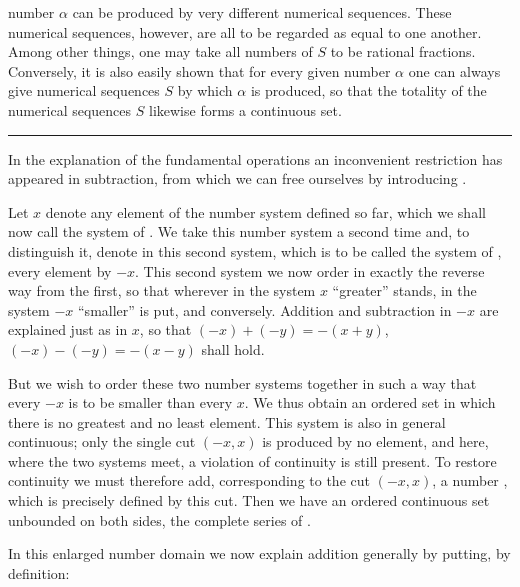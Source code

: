 number $\alpha$ can be produced by very different numerical sequences.
These numerical sequences, however, are all to be regarded as equal to
one another. Among other things, one may take all numbers of $S$ to be
rational fractions. Conversely, it is also easily shown that for every
given number $\alpha$ one can always give numerical sequences $S$ by
which $\alpha$ is produced, so that the totality of the numerical
sequences $S$ likewise forms a continuous set.

\begin{center}
\rule{0.18\linewidth}{0.4pt}
\end{center}

In the explanation of the fundamental operations an inconvenient
restriction has appeared in subtraction, from which we can free
ourselves by introducing .

Let $x$ denote any element of the number system defined so far, which
we shall now call the system of . We take
this number system a second time and, to distinguish it, denote in this
second system, which is to be called the system of , every element by $-x$. This second system we now order in
exactly the reverse way from the first, so that wherever in the system
$x$ ``greater'' stands, in the system $-x$ ``smaller'' is put, and
conversely. Addition and subtraction in $-x$ are explained just as in
$x$, so that $(-x)+(-y)=-(x+y)$, $(-x)-(-y)=-(x-y)$ shall hold.

But we wish to order these two number systems together in such a way
that every $-x$ is to be smaller than every $x$. We thus obtain an
ordered set in which there is no greatest and no least element. This
system is also in general continuous; only the single cut $(-x,x)$ is
produced by no element, and here, where the two systems meet, a
violation of continuity is still present. To restore continuity we
must therefore add, corresponding to the cut $(-x,x)$, a number
, which is precisely defined by this cut. Then
we have an ordered continuous set unbounded on both sides, the complete
series of .

In this enlarged number domain we now explain addition generally by
putting, by definition:
